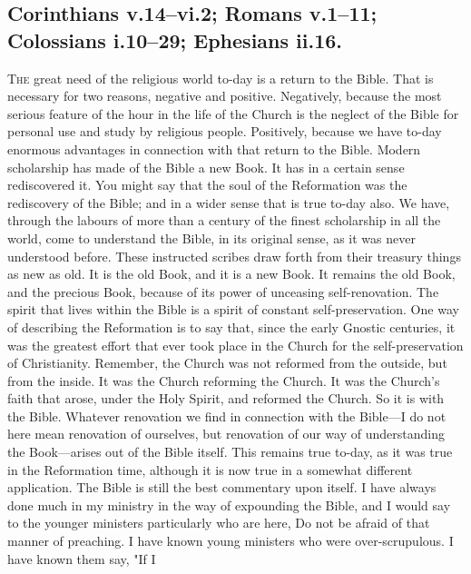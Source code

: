 \documentclass[draft]{ptfdoc}
\begin{document}

\subsection*{
Corinthians v.14--vi.2; Romans v.1--11; Colossians i.10--29;
Ephesians ii.16. 
}


\textsc{The} great need of the religious world to-day 
is a return to the Bible. That is necessary 
for two reasons, negative and positive. Negatively,
because the most serious feature of the 
hour in the life of the Church is the neglect of 
the Bible for personal use and study by religious 
people. Positively, because we have to-day enormous 
advantages in connection with that return 
to the Bible. Modern scholarship has made of 
the Bible a new Book. It has in a certain sense 
rediscovered it. You might say that the soul 
of the Reformation was the rediscovery of the 
Bible; and in a wider sense that is true to-day 
also. We have, through the labours of more 
than a century of the finest scholarship in all 
the world, come to understand the Bible, in 
its original sense, as it was never understood 
before. These instructed scribes draw forth 
from their treasury things as new as old. It 
is the old Book, and it is a new Book. It 
remains the old Book, and the precious Book, 
because of its power of unceasing self-renovation. 
The spirit that lives within the Bible is 
a spirit of constant self-preservation. One way 
of describing the Reformation is to say that, 
since the early Gnostic centuries, it was the 
greatest effort that ever took place in the 
Church for the self-preservation of Christianity. 
Remember, the Church was not reformed from 
the outside, but from the inside. It was the 
Church reforming the Church. It was the 
Church's faith that arose, under the Holy Spirit, 
and reformed the Church. So it is with the 
Bible. Whatever renovation we find in connection 
with the Bible---I do not here mean renovation 
of ourselves, but renovation of our way of 
understanding the Book---arises out of the Bible 
itself. This remains true to-day, as it was true 
in the Reformation time, although it is now 
true in a somewhat different application. The 
Bible is still the best commentary upon itself. 
I have always done much in my ministry in 
the way of expounding the Bible, and I would 
say to the younger ministers particularly who are 
here, Do not be afraid of that manner of preaching. 
I have known young ministers who were 
over-scrupulous. I have known them say, "If I 
\end{document}
